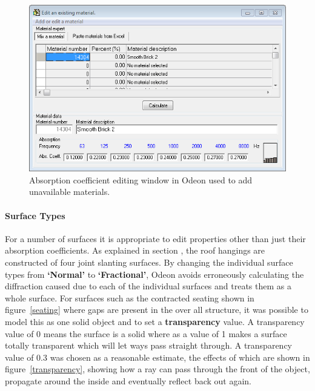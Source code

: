 \documentclass[../../main.tex]{subfiles}
\begin{document}
			\begin{figure}[H]
				\center\includegraphics[scale = 0.6]{Sections/Implementation/Odeon/images/Absorption.PNG}
				\caption{Absorption coefficient editing window in Odeon used to add unavailable materials.}
				\label{materialEdit}
			\end{figure}

		\paragraph{Surface Types}

			For a number of surfaces it is appropriate to edit properties other than just their absorption coefficients. As explained in section , the roof hangings are constructed of four joint slanting surfaces. By changing the individual surface types from \textbf{`Normal'} to \textbf{`Fractional'}, Odeon avoids erroneously calculating the diffraction caused due to each of the individual surfaces and treats them as a whole surface. For surfaces such as the contracted seating shown in figure~\ref{seating} where gaps are present in the over all structure, it was possible to model this as one solid object and to set a \textbf{transparency} value. A transparency value of 0 means the surface is a solid where as a value of 1 makes a surface totally transparent which will let ways pass straight through. A transparency value of 0.3 was chosen as a reasonable estimate, the effects of which are shown in figure~\ref{transparency}, showing how a ray can pass through the front of the object, propagate around the inside and eventually reflect back out again.
\end{document}
